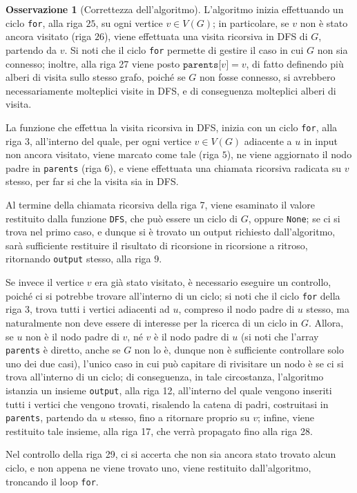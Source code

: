 \documentclass[14pt]{extreport}
\theoremstyle{definition}
\theoremstyle{definition}
\newtheorem{remark}{Osservazione}[subsection]
\begin{document}
\begin{remark}[Correttezza dell'algoritmo]
    L'algoritmo inizia effettuando un ciclo \texttt{for}, alla riga $25$, su ogni vertice $v \in V(G)$; in particolare, se $v$ non è stato ancora visitato (riga $26$), viene effettuata una visita ricorsiva in DFS di $G$, partendo da $v$. Si noti che il ciclo \texttt{for} permette di gestire il caso in cui $G$ non sia connesso; inoltre, alla riga 27 viene posto $\texttt{parents[}v\texttt{]} = v$, di fatto definendo più alberi di visita sullo stesso grafo, poiché se $G$ non fosse connesso, si avrebbero necessariamente molteplici visite in DFS, e di conseguenza molteplici alberi di visita.

    La funzione che effettua la visita ricorsiva in DFS, inizia con un ciclo \texttt{for}, alla riga $3$, all'interno del quale, per ogni vertice $v \in V(G)$ adiacente a $u$ in input non ancora visitato, viene marcato come tale (riga $5$), ne viene aggiornato il nodo padre in \texttt{parents} (riga $6$), e viene effettuata una chiamata ricorsiva radicata su $v$ stesso, per far si che la visita sia in DFS.

    Al termine della chiamata ricorsiva della riga 7, viene esaminato il valore restituito dalla funzione \texttt{DFS}, che può essere un ciclo di $G$, oppure \texttt{None}; se ci si trova nel primo caso, e dunque si è trovato un output richiesto dall'algoritmo, sarà sufficiente restituire il risultato di ricorsione in ricorsione a ritroso, ritornando \texttt{output} stesso, alla riga $9$.

    Se invece il vertice $v$ era già stato visitato, è necessario eseguire un controllo, poiché ci si potrebbe trovare all'interno di un ciclo; si noti che il ciclo \texttt{for} della riga 3, trova tutti i vertici adiacenti ad $u$, compreso il nodo padre di $u$ stesso, ma naturalmente non deve essere di interesse per la ricerca di un ciclo in $G$. Allora, se $u$ non è il nodo padre di $v$, né $v$ è il nodo padre di $u$ (si noti che l'array \texttt{parents} è diretto, anche se $G$ non lo è, dunque non è sufficiente controllare solo uno dei due casi), l'unico caso in cui può capitare di rivisitare un nodo è se ci si trova all'interno di un ciclo; di conseguenza, in tale circostanza, l'algoritmo istanzia un insieme \texttt{output}, alla riga 12, all'interno del quale vengono inseriti tutti i vertici che vengono trovati, risalendo la catena di padri, costruitasi in \texttt{parents}, partendo da $u$ stesso, fino a ritornare proprio su $v$; infine, viene restituito tale insieme, alla riga 17, che verrà propagato fino alla riga 28.

    Nel controllo della riga 29, ci si accerta che non sia ancora stato trovato alcun ciclo, e non appena ne viene trovato uno, viene restituito dall'algoritmo, troncando il loop \texttt{for}.
\end{remark}
\end{document}
